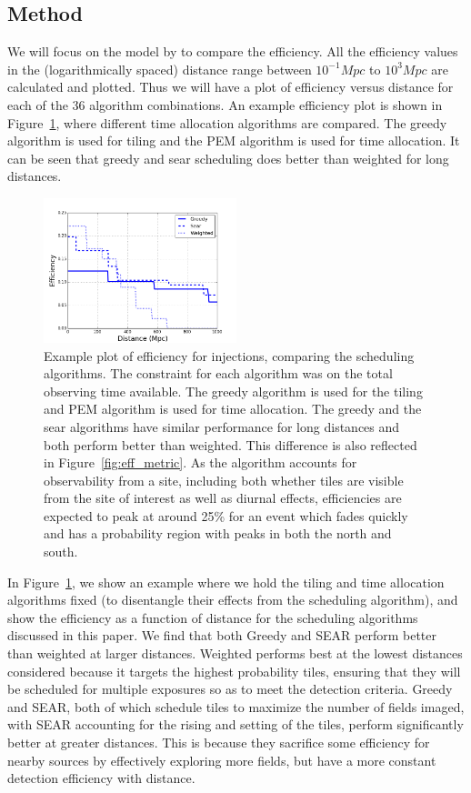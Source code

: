 \documentclass[twocolumn]{aastex62}
\begin{document}
\subsection{Method}
We will focus on the model by \cite{Me2017} to compare the efficiency. All the efficiency values in the (logarithmically spaced) distance range between $10^{-1} Mpc$ to $10^3 Mpc$ are calculated and plotted. Thus we will have a plot of efficiency versus distance for each of the 36 algorithm combinations. An example efficiency plot is shown in Figure~\ref{fig:eff_ex}, where different time allocation algorithms are compared. The greedy algorithm is used for tiling and the PEM algorithm is used for time allocation. It can be seen that greedy and sear scheduling does better than weighted for long distances. 

\begin{figure}[t]
\centering
\includegraphics[width=0.5\textwidth]{plots/eff_ex.png}
\caption{Example plot of efficiency for \cite{Me2017} injections, comparing the scheduling algorithms. The constraint for each algorithm was on the total observing time available. The greedy algorithm is used for the tiling and PEM algorithm is used for time allocation. The greedy and the sear algorithms have similar performance for long distances and both perform better than weighted. This difference is also reflected in Figure~\ref{fig:eff_metric}. As the algorithm accounts for observability from a site, including both whether tiles are visible from the site of interest as well as diurnal effects, efficiencies are expected to peak at around 25\% for an event which fades quickly and has a probability region with peaks in both the north and south.}
\label{fig:eff_ex}
\end{figure}
In Figure~\ref{fig:eff_ex}, we show an example where we hold the tiling and time allocation algorithms fixed (to disentangle their effects from the scheduling algorithm), and show the efficiency as a function of distance for the scheduling algorithms discussed in this paper. We find that both Greedy and SEAR perform better than weighted at larger distances. Weighted performs best at the lowest distances considered because it targets the highest probability tiles, ensuring that they will be scheduled for multiple exposures so as to meet the detection criteria. Greedy and SEAR, both of which schedule tiles to maximize the number of fields imaged, with SEAR accounting for the rising and setting of the tiles, perform significantly better at greater distances. This is because they sacrifice some efficiency for nearby sources by effectively exploring more fields, but have a more constant detection efficiency with distance.
\end{document}
